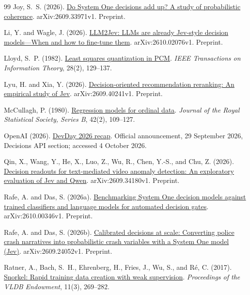 \documentclass[11pt,a4paper]{article}
\begin{document}
\begin{thebibliography}{99}
Joy, S.~S. (2026).
\href{https://arxiv.org/abs/2609.33971v1}{Do System One decisions add up? A study of probabilistic coherence}.
arXiv:2609.33971v1. Preprint.

Li, Y. and Wagle, J. (2026).
\href{https://arxiv.org/abs/2610.02076v1}{LLM2Jev: LLMs are already Jev-style decision models---When and how to fine-tune them}.
arXiv:2610.02076v1. Preprint.

Lloyd, S.~P. (1982).
\href{https://doi.org/10.1109/TIT.1982.1056489}{Least squares quantization in PCM}.
\emph{IEEE Transactions on Information Theory}, 28(2), 129--137.

Lyu, H. and Xia, Y. (2026).
\href{https://arxiv.org/abs/2609.40241v1}{Decision-oriented recommendation reranking: An empirical study of Jev}.
arXiv:2609.40241v1. Preprint.

McCullagh, P. (1980).
\href{https://doi.org/10.1111/j.2517-6161.1980.tb01109.x}{Regression models for ordinal data}.
\emph{Journal of the Royal Statistical Society, Series B}, 42(2), 109--127.

OpenAI (2026).
\href{https://openai.com/index/devday-2026-recap/}{DevDay 2026 recap}.
Official announcement, 29 September 2026, Decisions API section; accessed 4 October 2026.

Qin, X., Wang, Y., He, X., Luo, Z., Wu, R., Chen, Y.-S., and Chu, Z. (2026).
\href{https://arxiv.org/abs/2609.34180v1}{Decision readouts for text-mediated video anomaly detection: An exploratory evaluation of Jev and Qwen}.
arXiv:2609.34180v1. Preprint.

Rafe, A. and Das, S. (2026a).
\href{https://arxiv.org/abs/2610.00346v1}{Benchmarking System One decision models against trained classifiers and language models for automated decision gates}.
arXiv:2610.00346v1. Preprint.

Rafe, A. and Das, S. (2026b).
\href{https://arxiv.org/abs/2609.24052v1}{Calibrated decisions at scale: Converting police crash narratives into probabilistic crash variables with a System One model (Jev)}.
arXiv:2609.24052v1. Preprint.

Ratner, A., Bach, S.~H., Ehrenberg, H., Fries, J., Wu, S., and R{\'e}, C. (2017).
\href{https://doi.org/10.14778/3157794.3157797}{Snorkel: Rapid training data creation with weak supervision}.
\emph{Proceedings of the VLDB Endowment}, 11(3), 269--282.


\end{thebibliography}
\end{document}
